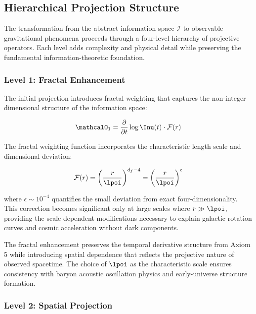 \subsection{Hierarchical Projection Structure}
\label{subsec:hierarchical-projection}

The transformation from the abstract information space $\mathcal{I}$ to observable gravitational phenomena proceeds through a four-level hierarchy of projective operators. Each level adds complexity and physical detail while preserving the fundamental information-theoretic foundation.

\subsubsection{Level 1: Fractal Enhancement}
\label{subsubsec:level1-fractal}

The initial projection introduces fractal weighting that captures the non-integer dimensional structure of the information space:

\begin{equation}
\mathcalO_1 = \frac{\partial}{\partial t} \log \Inu(t) \cdot \mathcal{F}(r)
\label{eq:level1-projection}
\end{equation}

The fractal weighting function incorporates the characteristic length scale and dimensional deviation:

\begin{equation}
\mathcal{F}(r) = \left(\frac{r}{\lpoi}\right)^{d_f-4} = \left(\frac{r}{\lpoi}\right)^{\epsilon}
\label{eq:fractal-weighting}
\end{equation}

where $\epsilon \sim 10^{-4}$ quantifies the small deviation from exact four-dimensionality. This correction becomes significant only at large scales where $r \gg \lpoi$, providing the scale-dependent modifications necessary to explain galactic rotation curves and cosmic acceleration without dark components.

The fractal enhancement preserves the temporal derivative structure from Axiom 5 while introducing spatial dependence that reflects the projective nature of observed spacetime. The choice of $\lpoi$ as the characteristic scale ensures consistency with baryon acoustic oscillation physics and early-universe structure formation.

\subsubsection{Level 2: Spatial Projection}
\label{subsubsec:level2-spatial}

